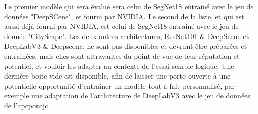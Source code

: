 ﻿\noindent Le premier modèle qui sera évalué sera celui de SegNet18 entrainé avec le jeu de données "DeepSCene", et fourni par NVIDIA. Le second de la liste, et qui est aussi déjà fourni par NVIDIA, est celui de SegNet18 entrainé avec le jeu de donnée "CityScape". Les deux autres architectures, ResNet101 \& DeepScene et DeepLabV3 \& Deepscene, ne sont pas disponibles et devront être préparées et entrainées, mais elles sont attrayantes du point de vue de leur réputation et potentiel, et vouloir les adapter au contexte de l'essai semble logique. Une dernière boite vide est disponible, afin de laisser une porte ouverte à une potentielle opportunité d'entrainer un modèle tout à fait personnalisé, par exemple une adaptation de l'architecture de DeepLabV3 avec le jeu de données de l'\acrshort{apcpontjc}.
